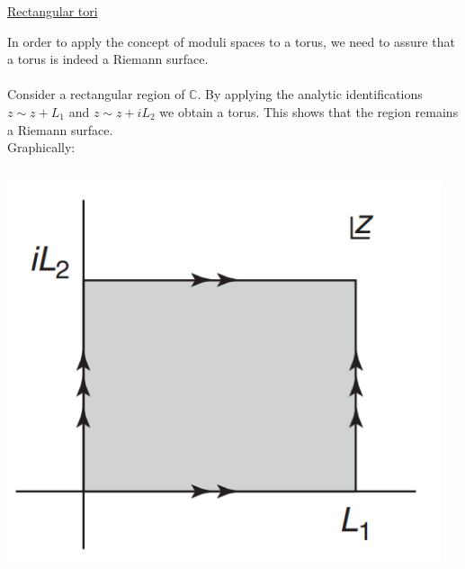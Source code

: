\documentclass[11pt,aspectratio=169]{beamer}
\begin{document}
\begin{frame}{\underline{Rectangular tori}}

	In order to apply the concept of moduli spaces to a torus, we need to assure that a torus is indeed a Riemann surface.
	\\~\\
	Consider a rectangular region of $\mathbb{C}$. By applying the analytic identifications $z \sim z + L_1$ and $z \sim z + iL_2$
	we obtain a torus. This shows that the region remains a Riemann surface. 
	\\
	Graphically:
	\begin{columns}
		\begin{column}{0.25\textwidth}
			\includegraphics[width=\columnwidth]{elements/region C.PNG}
		\end{column}
		\begin{column}{0.2\textwidth}

\end{column}
\end{columns}
\end{frame}
\end{document}
